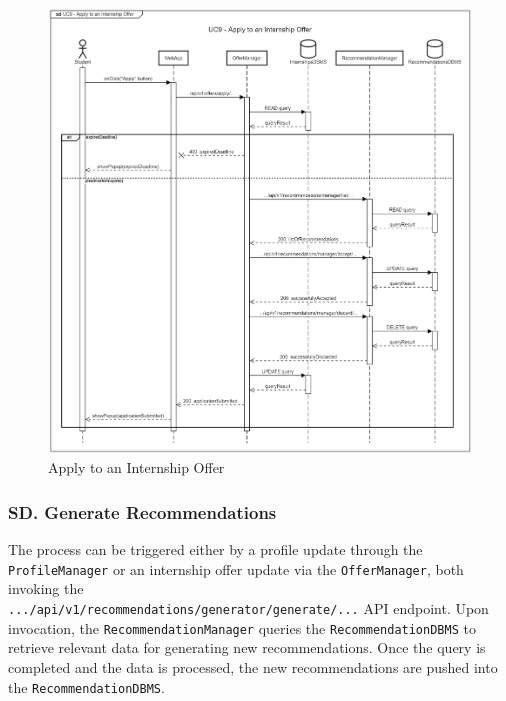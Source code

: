 \begin{figure}[H]
    \begin{center}
         \includegraphics[width=0.9\linewidth]{LaTeXCode/images/SequenceDiagrams/UC9-sequenceDiagram.png}
         \caption{Apply to an Internship Offer}
         \label{fig:apply_to_internships_sd}
     \end{center}
\end{figure}

\subsubsection*{SD\cuc. Generate Recommendations}
\label{subsubsec:generate_recommendations_sd}
The process can be triggered either by a profile update through the \texttt{ProfileManager} or an internship offer update via the \texttt{OfferManager}, both invoking the \\ \texttt{.../api/v1/recommendations/generator/generate/...} API endpoint.
Upon invocation, the \texttt{RecommendationManager} queries the \texttt{RecommendationDBMS} to retrieve relevant data for generating new recommendations. Once the query is completed and the data is processed, the new recommendations are pushed into the \texttt{RecommendationDBMS}.

